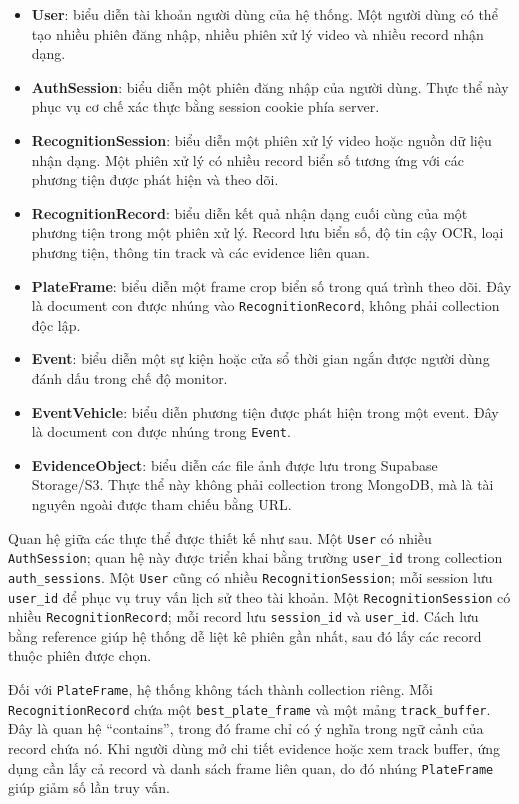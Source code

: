 \begin{itemize}
    \item \textbf{User}: biểu diễn tài khoản người dùng của hệ thống. Một người dùng có thể tạo nhiều phiên đăng nhập, nhiều phiên xử lý video và nhiều record nhận dạng.
    \item \textbf{AuthSession}: biểu diễn một phiên đăng nhập của người dùng. Thực thể này phục vụ cơ chế xác thực bằng session cookie phía server.
    \item \textbf{RecognitionSession}: biểu diễn một phiên xử lý video hoặc nguồn dữ liệu nhận dạng. Một phiên xử lý có nhiều record biển số tương ứng với các phương tiện được phát hiện và theo dõi.
    \item \textbf{RecognitionRecord}: biểu diễn kết quả nhận dạng cuối cùng của một phương tiện trong một phiên xử lý. Record lưu biển số, độ tin cậy OCR, loại phương tiện, thông tin track và các evidence liên quan.
    \item \textbf{PlateFrame}: biểu diễn một frame crop biển số trong quá trình theo dõi. Đây là document con được nhúng vào \texttt{RecognitionRecord}, không phải collection độc lập.
    \item \textbf{Event}: biểu diễn một sự kiện hoặc cửa sổ thời gian ngắn được người dùng đánh dấu trong chế độ monitor.
    \item \textbf{EventVehicle}: biểu diễn phương tiện được phát hiện trong một event. Đây là document con được nhúng trong \texttt{Event}.
    \item \textbf{EvidenceObject}: biểu diễn các file ảnh được lưu trong Supabase Storage/S3. Thực thể này không phải collection trong MongoDB, mà là tài nguyên ngoài được tham chiếu bằng URL.
\end{itemize}

Quan hệ giữa các thực thể được thiết kế như sau. Một \texttt{User} có nhiều \texttt{AuthSession}; quan hệ này được triển khai bằng trường \texttt{user\_id} trong collection \texttt{auth\_sessions}. Một \texttt{User} cũng có nhiều \texttt{RecognitionSession}; mỗi session lưu \texttt{user\_id} để phục vụ truy vấn lịch sử theo tài khoản. Một \texttt{RecognitionSession} có nhiều \texttt{RecognitionRecord}; mỗi record lưu \texttt{session\_id} và \texttt{user\_id}. Cách lưu bằng reference giúp hệ thống dễ liệt kê phiên gần nhất, sau đó lấy các record thuộc phiên được chọn.

Đối với \texttt{PlateFrame}, hệ thống không tách thành collection riêng. Mỗi \texttt{RecognitionRecord} chứa một \texttt{best\_plate\_frame} và một mảng \texttt{track\_buffer}. Đây là quan hệ ``contains'', trong đó frame chỉ có ý nghĩa trong ngữ cảnh của record chứa nó. Khi người dùng mở chi tiết evidence hoặc xem track buffer, ứng dụng cần lấy cả record và danh sách frame liên quan, do đó nhúng \texttt{PlateFrame} giúp giảm số lần truy vấn.

